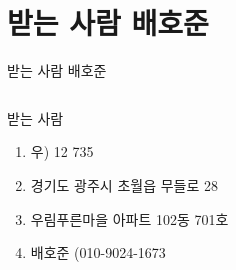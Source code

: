 \documentclass[aspectratio=1610,12pt,xcolor=pdftex,dvipsnames,table,handout]{beamer}
\begin{document}
		\section{받는 사람 배호준}
		\begin{frame}[c,plain]{받는 사람 배호준}

		\begin{columns}[t]
		\begin{column}{1.0\textwidth}

			\begin{block} {받는 사람}
			\begin{enumerate}
			\item [] 우) 12 735
			\item [] 경기도 광주시 초월읍 무들로 28
			\item [] 우림푸른마을 아파트 102동 701호
			\item [] 배호준  (010-9024-1673
			\end{enumerate}
			\end{block}
		\end{column}
		\end{columns}

		\end{frame}



\end{document}
